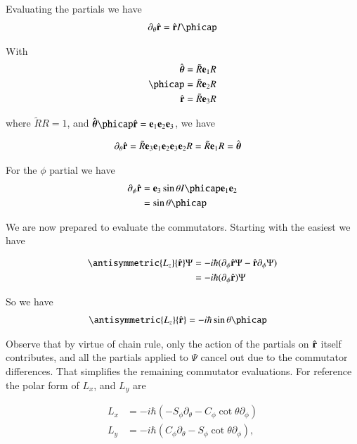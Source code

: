 Evaluating the partials we have
\begin{align*}
\partial_\theta \rcap = \rcap I \phicap
\end{align*}

With
\begin{align}\label{eqn:desaiCh4:602}
\thetacap &= \tilde{R} \Be_1 R \\
\phicap &= \tilde{R} \Be_2 R \\
\rcap &= \tilde{R} \Be_3 R
\end{align}

where $\tilde{R} R = 1$, and $\thetacap \phicap \rcap = \Be_1 \Be_2 \Be_3$, we have

\begin{align}\label{eqn:desaiCh4:601}
\partial_\theta \hat{\mathbf{r}} &= \tilde{R} \mathbf{e}_3 \mathbf{e}_1 \mathbf{e}_2 \mathbf{e}_3 \mathbf{e}_2 R = \tilde{R} \mathbf{e}_1 R = \hat{\boldsymbol{\theta}}
\end{align}

For the $\phi$ partial we have
\begin{align*}
\partial_\phi \rcap
&= \Be_3 \sin\theta I \phicap \Be_1 \Be_2 \\
&= \sin\theta \phicap
\end{align*}

We are now prepared to evaluate the commutators.  Starting with the easiest we have

\begin{align*}
\antisymmetric{L_z}{\rcap} \Psi
&=
-i \hbar (\partial_\phi \rcap \Psi - \rcap \partial_\phi \Psi ) \\
&=
-i \hbar (\partial_\phi \rcap) \Psi  \\
\end{align*}

So we have
\begin{align}\label{eqn:desaiCh4:610}
\antisymmetric{L_z}{\rcap}
&=
-i \hbar \sin\theta \phicap
\end{align}

Observe that by virtue of chain rule, only the action of the partials on $\hat{\mathbf{r}}$ itself contributes, and all the partials applied to $\Psi$ cancel out due to the commutator differences.  That simplifies the remaining commutator evaluations.  For reference the polar form of $L_x$, and $L_y$ are

\begin{align}\label{eqn:desaiCh4:611}
L_x &= -i \hbar (-S_\phi \partial_\theta - C_\phi \cot\theta \partial_\phi) \\
L_y &= -i \hbar (C_\phi \partial_\theta - S_\phi \cot\theta \partial_\phi),
\end{align}


